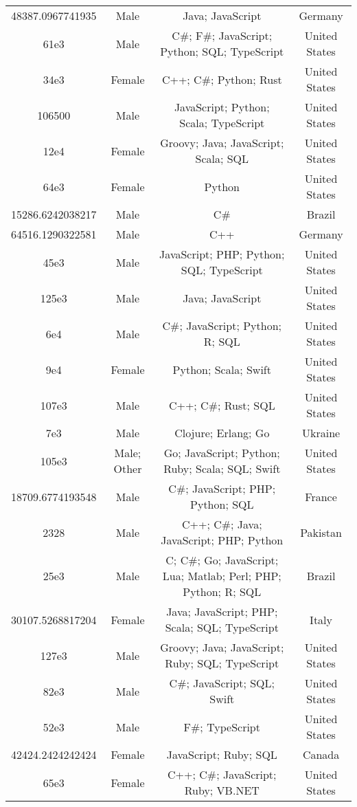 \begin{center}
\begin{tabular}{ |c|c|c|c| }
48387.0967741935  &  Male  &  Java; JavaScript  &  Germany  \\ 
61e3  &  Male  &  C\#; F\#; JavaScript; Python; SQL; TypeScript  &  United States  \\ 
34e3  &  Female  &  C++; C\#; Python; Rust  &  United States  \\ 
106500  &  Male  &  JavaScript; Python; Scala; TypeScript  &  United States  \\ 
12e4  &  Female  &  Groovy; Java; JavaScript; Scala; SQL  &  United States  \\ 
64e3  &  Female  &  Python  &  United States  \\ 
15286.6242038217  &  Male  &  C\#  &  Brazil  \\ 
64516.1290322581  &  Male  &  C++  &  Germany  \\ 
45e3  &  Male  &  JavaScript; PHP; Python; SQL; TypeScript  &  United States  \\ 
125e3  &  Male  &  Java; JavaScript  &  United States  \\ 
6e4  &  Male  &  C\#; JavaScript; Python; R; SQL  &  United States  \\ 
9e4  &  Female  &  Python; Scala; Swift  &  United States  \\ 
107e3  &  Male  &  C++; C\#; Rust; SQL  &  United States  \\ 
7e3  &  Male  &  Clojure; Erlang; Go  &  Ukraine  \\ 
105e3  &  Male; Other  &  Go; JavaScript; Python; Ruby; Scala; SQL; Swift  &  United States  \\ 
18709.6774193548  &  Male  &  C\#; JavaScript; PHP; Python; SQL  &  France  \\ 
2328  &  Male  &  C++; C\#; Java; JavaScript; PHP; Python  &  Pakistan  \\ 
25e3  &  Male  &  C; C\#; Go; JavaScript; Lua; Matlab; Perl; PHP; Python; R; SQL  &  Brazil  \\ 
30107.5268817204  &  Female  &  Java; JavaScript; PHP; Scala; SQL; TypeScript  &  Italy  \\ 
127e3  &  Male  &  Groovy; Java; JavaScript; Ruby; SQL; TypeScript  &  United States  \\ 
82e3  &  Male  &  C\#; JavaScript; SQL; Swift  &  United States  \\ 
52e3  &  Male  &  F\#; TypeScript  &  United States  \\ 
42424.2424242424  &  Female  &  JavaScript; Ruby; SQL  &  Canada  \\ 
65e3  &  Female  &  C++; C\#; JavaScript; Ruby; VB.NET  &  United States  \\ 

\end{tabular}
\end{center}
